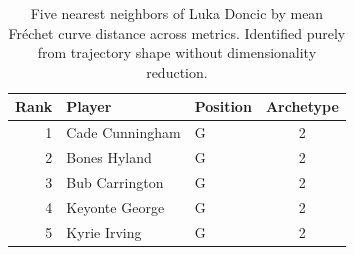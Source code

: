 \begin{table}[htbp]
  \centering\small
  \begin{tabular}{rllc}
    \toprule
    Rank & Player & Position & Archetype \\
    \midrule
    1 & Cade Cunningham & G & 2 \\
    2 & Bones Hyland & G & 2 \\
    3 & Bub Carrington & G & 2 \\
    4 & Keyonte George & G & 2 \\
    5 & Kyrie Irving & G & 2 \\
    \bottomrule
  \end{tabular}
  \caption{Five nearest neighbors of Luka Doncic by mean Fr\'{e}chet curve distance across metrics. Identified purely from trajectory shape without dimensionality reduction.}
  \label{tab:Luka_Doncic_frechet_curve_neighbors}
\end{table}

